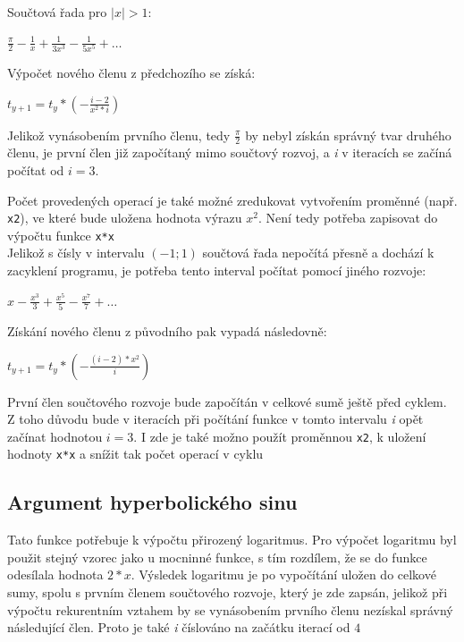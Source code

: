 \documentclass[12pt,a4paper,titlepage,final]{article}
\begin{document}
Součtová řada pro $|x| > 1$:
\begin{center}
$ {\displaystyle \frac{\pi}{2} - \frac{1}{x} + \frac{1}{3x^{3}} - 
\frac{1}{5x^{5}} + \ldots}$\end{center}

Výpočet nového členu z předchozího se získá:

\begin{center}
$ {\displaystyle t_{y+1} = t_{y} * (-\frac{i-2}{x^{2}*i})}$\end{center}

Jelikož vynásobením prvního členu, tedy $\frac{\pi}{2}$ by nebyl získán
správný tvar druhého členu, je první člen již započítaný mimo součtový
rozvoj, a \textit{i} v iteracích se začíná počítat od $\textit{i} = 3$. 

Počet provedených operací je také možné zredukovat vytvořením proměnné 
(např. \texttt{x2}), ve
které bude uložena hodnota výrazu $x^{2}$. Není tedy potřeba zapisovat do 
výpočtu funkce
\texttt{x*x} \\

Jelikož s čísly v intervalu $(-1;1)$ součtová řada nepočítá přesně a dochází
k zacyklení programu, je potřeba tento interval počítat pomocí jiného rozvoje:

\begin{center}
$ {\displaystyle x - \frac{x^{3}}{3} + \frac{x^{5}}{5} - \frac{x^{7}}{7} + 
\ldots}$\end{center}

Získání nového členu z původního pak vypadá následovně:

\begin{center}
$ {\displaystyle t_{y+1} = t_{y} * (-\frac{(i-2)*x^{2}}{i})}$\end{center}

První člen součtového rozvoje bude započítán v celkové sumě ještě před cyklem.
Z toho důvodu bude v iteracích při počítání funkce v tomto intervalu 
\textit{i} opět začínat hodnotou $\textit{i} = 3$. I zde je také možno použít 
proměnnou \texttt{x2}, k uložení hodnoty \texttt{x*x} a snížit tak počet 
operací v cyklu

\subsection{Argument hyperbolického sinu}

Tato funkce potřebuje k výpočtu přirozený logaritmus. Pro výpočet logaritmu
byl použit stejný vzorec jako u mocninné funkce, s tím rozdílem, že se do
funkce odesílala hodnota $2*x$. Výsledek logaritmu je po vypočítání uložen do
celkové sumy, spolu s prvním členem součtového rozvoje, který je zde 
zapsán, jelikož při výpočtu rekurentním vztahem by se vynásobením prvního
členu nezískal správný následující člen. Proto je také \textit{i} číslováno na
začátku iterací od $4$
\end{document}
